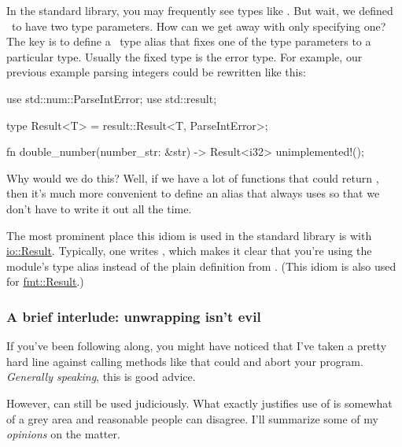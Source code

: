 
In the standard library, you may frequently see types like . But wait, we defined \result\ to have 
two type parameters. How can we get away with only specifying one? The key is to define a \result\ type alias that 
fixes one of the type parameters to a particular type. Usually the fixed type is the error type. For example, our previous 
example parsing integers could be rewritten like this:

\begin{rustc}
use std::num::ParseIntError;
use std::result;

type Result<T> = result::Result<T, ParseIntError>;

fn double_number(number_str: &str) -> Result<i32> {
    unimplemented!();
}
\end{rustc}

Why would we do this? Well, if we have a lot of functions that could return , then it's much more 
convenient to define an alias that always uses  so that we don't have to write it out all the time.

\blank

The most prominent place this idiom is used in the standard library is with 
\href{https://doc.rust-lang.org/std/io/type.Result.html}{io::Result}. Typically, one writes , which 
makes it clear that you're using the  module's type alias instead of the plain definition from . 
(This idiom is also used for \href{https://doc.rust-lang.org/std/fmt/type.Result.html}{fmt::Result}.)

\subsubsection*{A brief interlude: unwrapping isn't evil}

If you've been following along, you might have noticed that I've taken a pretty hard line against calling methods like 
 that could  and abort your program. \emph{Generally speaking}, this is good advice.

\blank

However,  can still be used judiciously. What exactly justifies use of  is somewhat of a grey 
area and reasonable people can disagree. I'll summarize some of my \emph{opinions} on the matter.

